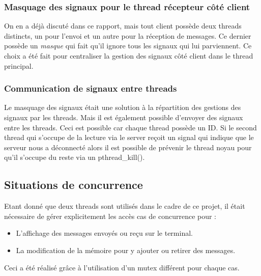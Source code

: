 \documentclass{article}
\begin{document}
\subsubsection{Masquage des signaux pour le thread récepteur côté client}
 On en a déjà discuté dans ce rapport, mais tout client possède deux threads distincts, un pour l'envoi et un autre pour la réception de messages. Ce dernier possède un \textit{masque} qui fait qu'il ignore tous les signaux qui lui parviennent. Ce choix a été fait pour centraliser la gestion des signaux côté client dans le thread principal.

\subsubsection{Communication de signaux entre threads}
Le masquage des signaux était une solution à la répartition des gestions des signaux par les threads. Mais il est également possible d'envoyer des signaux entre les threads. Ceci est possible car chaque thread possède un ID. Si le second thread qui s'occupe de la lecture via le server reçoit un signal qui indique que le serveur nous a déconnecté alors il est possible de prévenir le thread noyau pour qu'il s'occupe du reste via un pthread\_kill().



\subsection{Situations de concurrence}
Etant donné que deux threads sont utilisés dans le cadre de ce projet, il était nécessaire de gérer explicitement les accès cas de concurrence pour :
\begin{itemize}
    \item L'affichage des messages envoyés ou reçu sur le terminal.
    \item La modification de la mémoire pour y ajouter ou retirer des messages.
\end{itemize}
Ceci a été réalisé grâce à l'utilisation d'un mutex différent pour chaque cas.
\end{document}
